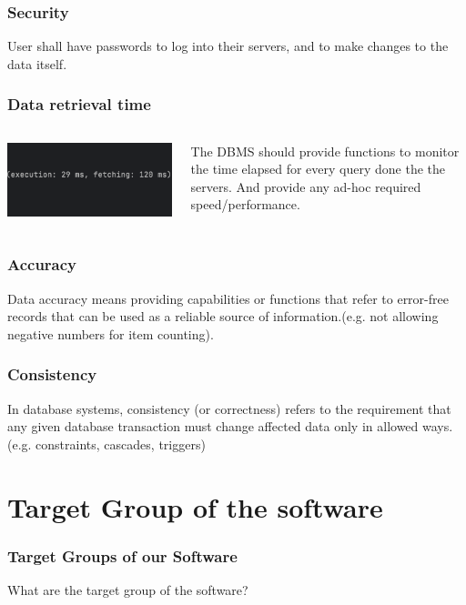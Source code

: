 \documentclass{beamer}
\begin{document}
\begin{frame}
	\frametitle{Security}
	User shall have passwords to log into their servers, and to make changes to the data itself.
\end{frame}


\begin{frame}
	\frametitle{Data retrieval time}	
	\begin{columns}
	\begin{column}{0.4\textwidth}
		\includegraphics[width=\columnwidth]{elapsedtime.png}
	\end{column}	
	\begin{column}{0.4\textwidth}
	The DBMS should provide functions to monitor the time elapsed for every query done the the servers. And provide any ad-hoc required speed/performance. 
	\end{column}
	\end{columns}
\end{frame}

\begin{frame}
	\frametitle{Accuracy}	
	Data accuracy means providing capabilities or functions that refer to error-free records that can be used as a reliable source of information.(e.g. not allowing negative numbers for item counting).
\end{frame}

\begin{frame}
	\frametitle{Consistency}	
	In database systems, consistency (or correctness) refers to the requirement that any given database transaction must change affected data only in allowed ways. (e.g. constraints, cascades, triggers)
\end{frame}

\section{Target Group of the software}
\begin{frame}
	\frametitle{Target Groups of our Software}	
	\centering What are the target group of the software?
\end{frame}
\end{document}
